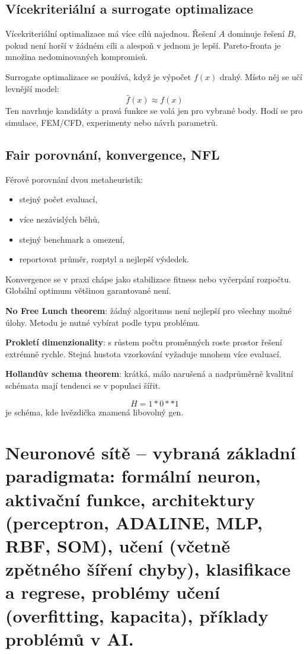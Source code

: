 \subsection*{Vícekriteriální a surrogate optimalizace}
Vícekriteriální optimalizace má více cílů najednou. Řešení \(A\) dominuje
řešení \(B\), pokud není horší v žádném cíli a alespoň v jednom je lepší.
Pareto-fronta je množina nedominovaných kompromisů.

Surrogate optimalizace se používá, když je výpočet \(f(x)\) drahý. Místo něj se
učí levnější model:
\begin{equation}
    \hat f(x) \approx f(x)
\end{equation}
Ten navrhuje kandidáty a pravá funkce se volá jen pro vybrané body. Hodí se pro
simulace, FEM/CFD, experimenty nebo návrh parametrů.

\subsection*{Fair porovnání, konvergence, NFL}
Férové porovnání dvou metaheuristik:
\begin{itemize}
    \item stejný počet evaluací,
    \item více nezávislých běhů,
    \item stejný benchmark a omezení,
    \item reportovat průměr, rozptyl a nejlepší výsledek.
\end{itemize}

Konvergence se v praxi chápe jako stabilizace fitness nebo vyčerpání rozpočtu.
Globální optimum většinou garantované není.

\textbf{No Free Lunch theorem}: žádný algoritmus není nejlepší pro všechny možné úlohy. Metodu je nutné vybírat podle typu problému.

\textbf{Prokletí dimenzionality}: s růstem počtu proměnných roste prostor řešení extrémně rychle. Stejná hustota vzorkování vyžaduje mnohem více evaluací.

\textbf{Hollandův schema theorem}: krátká, málo narušená a nadprůměrně kvalitní schémata mají tendenci se v populaci šířit.

\begin{equation}
    H = 1 * 0 * * 1
\end{equation}
je schéma, kde hvězdička znamená libovolný gen.

\section{Neuronové sítě – vybraná základní paradigmata: formální neuron, aktivační funkce, architektury (perceptron, ADALINE, MLP, RBF, SOM), učení (včetně zpětného šíření chyby), klasifikace a regrese, problémy učení (overfitting, kapacita), příklady problémů v AI.}


